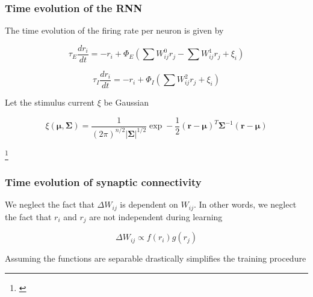 \documentclass{beamer}
\begin{document}
\begin{frame}[plain]
\frametitle{Time evolution of the RNN}

The time evolution of the firing rate per neuron is given by

\begin{equation*}
\tau_{E} \frac{dr_{i}}{dt} = -r_{i} + \Phi_{E}\left(\sum W_{ij}^{0}r_{j} - \sum W_{ij}^{1}r_{j} + \xi_{i} \right)
\end{equation*}

\begin{equation*}
\tau_{I} \frac{dr_{i}}{dt} = -r_{i} + \Phi_{I}\left(\sum W_{ij}^{2}r_{j}  + \xi_{i} \right)
\end{equation*}

\vspace{0.2in}

Let the stimulus current $\xi$ be Gaussian

\begin{equation*}
\xi(\bm{\mu}, \bm{\Sigma}) = \frac{1}{(2\pi)^{n/2}|\bm{\Sigma}|^{1/2}}\exp-\frac{1}{2}(\bm{r}-\bm{\mu})^{T}\bm{\Sigma}^{-1}(\bm{r}-\bm{\mu})
\end{equation*}


\footnote{\cite{hopfield}}
\end{frame}


\begin{frame}[plain]
\frametitle{Time evolution of synaptic connectivity}

We neglect the fact that $\Delta W_{ij}$ is dependent on $W_{ij}$. In other words, we neglect the fact that $r_{i}$ and $r_{j}$ are not independent during learning

\begin{equation*}
\Delta W_{ij} \propto f(r_{i})g(r_{j})
\end{equation*}

Assuming the functions are separable drastically simplifies the training procedure 

\end{frame}
\end{document}
